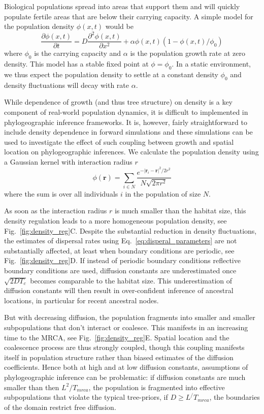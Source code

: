 \documentclass[aps,rmp, twocolumn]{revtex4}
\newcommand{\rvec}{\mathbf{r}}
\begin{document}
Biological populations spread into areas that support them and will quickly populate fertile areas that are below their carrying capacity.
A simple model for the population density $\phi(x,t)$ would be
\begin{equation}
    \label{eq:FKPP}
    \frac{\partial \phi(x,t)}{\partial t} = D\frac{\partial^2 \phi(x,t)}{\partial x^2} + \alpha \phi(x,t)(1-\phi(x,t)/\phi_0)
\end{equation}
where $\phi_0$ is the carrying capacity and $\alpha$ is the population growth rate at zero density.
This model has a stable fixed point at $\phi=\phi_0$.
In a static environment, we thus expect the population density to settle at a constant density $\phi_0$ and density fluctuations will decay with rate $\alpha$.

While dependence of growth (and thus tree structure) on density is a key component of real-world population dynamics, it is difficult to implemented in phylogeographic inference frameworks.
It is, however, fairly straightforward to include density dependence in forward simulations and these simulations can be used to investigate the effect of such coupling between growth and spatial location on phylogeographic inferences.
We calculate the population density using a Gaussian kernel with interaction radius $r$
\begin{equation}
    \phi(\rvec) = \sum_{i\in N} \frac{e^{-|\rvec_i - \rvec|^2/2r^2}}{N\sqrt{2\pi r^2}}
\end{equation}
where the sum is over all individuals $i$ in the population of size $N$.

As soon as the interaction radius $r$ is much smaller than the habitat size, this density regulation leads to a more homogeneous population density, see Fig.~\ref{fig:density_reg}C.
Despite the substantial reduction in density fluctuations, the estimates of dispersal rates using Eq.~\ref{eq:disperal_parameters} are not substantially affected, at least when boundary conditions are periodic, see Fig.~\ref{fig:density_reg}D.
If instead of periodic boundary conditions reflective boundary conditions are used, diffusion constants are underestimated once $\sqrt{2DT_c}$ becomes comparable to the habitat size.
This underestimation of diffusion constants will then result in over-confident inference of ancestral locations, in particular for recent ancestral nodes.

But with decreasing diffusion, the population fragments into smaller and smaller subpopulations that don't interact or coalesce.
This manifests in an increasing time to the MRCA, see Fig.~\ref{fig:density_reg}E.
Spatial location and the coalescence process are thus strongly coupled, though this coupling manifests itself in population structure rather than biased estimates of the diffusion coefficients.
Hence both at high and at low diffusion constants, assumptions of phylogeographic inference can be problematic: if diffusion constants are much smaller than then $L^2/T_{mrca}$, the population is fragmented into effective subpopulations that violate the typical tree-priors, if $D\geq L^/T_{mrca}$, the boundaries of the domain restrict free diffusion.
\end{document}
